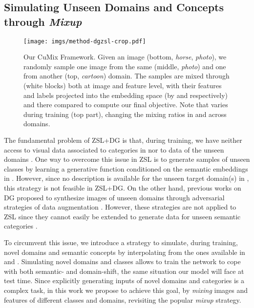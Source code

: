 \documentclass[runningheads]{llncs}
\newcommand{\methodName}{{CuMix} }
\begin{document}
\subsection{Simulating Unseen Domains and Concepts through \textit{Mixup}}

\begin{figure}[tb]
  \centering
  \texttt{[image: imgs/method-dgzsl-crop.pdf]} 
  \caption{Our \methodName Framework. Given an image (bottom, \textit{horse}, \textit{photo}), we randomly sample one image from the same (middle, \textit{photo}) and one from another (top, \textit{cartoon}) domain. The samples are mixed through  (white blocks) both at image and feature level, with their features and labels projected into the embedding space  (by  and  respectively) and there compared to compute our final objective. Note that  varies during training (top part), changing the mixing ratios in and across domains. }
  \label{fig:method}
 \end{figure}
 
The fundamental problem of ZSL+DG is that, during training, we have neither access to visual data associated to categories in  nor to data of the unseen domains . One way to overcome this issue in ZSL is to generate samples of unseen classes by learning a generative function conditioned on the semantic embeddings in {} \cite{xian2018feature,xian2019fvaegan}. However, since no {description} is available for the unseen target domain(s) in , this strategy is not feasible in ZSL+DG. On the other hand, previous works on DG proposed to synthesize images of unseen domains through adversarial strategies of data augmentation  {\cite{volpi2018generalizing,shankar2018generalizing}}. However, these strategies are not applied to ZSL since they cannot easily be extended to generate data for unseen semantic categories 
. 

To circumvent this issue, we introduce a strategy to simulate, during training, novel domains and semantic concepts by interpolating from the ones available in  and . Simulating novel domains and classes allows to train the network to cope with both semantic- and domain-shift, the same situation our model will face at test time. Since explicitly generating inputs of novel domains and categories is a complex task, in this work we propose to achieve this goal, by \textit{mixing} images and features of different classes and domains, revisiting the popular \textit{mixup} \cite{zhang2017mixup} strategy. 
\end{document}
